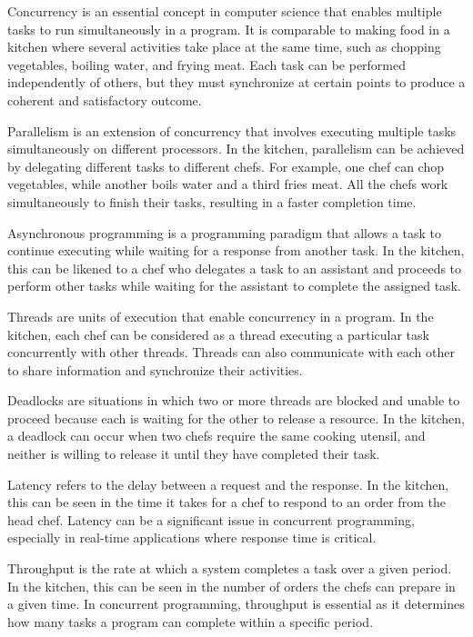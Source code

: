 Concurrency is an essential concept in computer science that enables multiple tasks to run simultaneously in a program.
It is comparable to making food in a kitchen where several activities take place at the same time, such as chopping vegetables, boiling water, and frying meat.
Each task can be performed independently of others, but they must synchronize at certain points to produce a coherent and satisfactory outcome.

Parallelism is an extension of concurrency that involves executing multiple tasks simultaneously on different processors.
In the kitchen, parallelism can be achieved by delegating different tasks to different chefs.
For example, one chef can chop vegetables, while another boils water and a third fries meat.
All the chefs work simultaneously to finish their tasks, resulting in a faster completion time.

Asynchronous programming is a programming paradigm that allows a task to continue executing while waiting for a response from another task.
In the kitchen, this can be likened to a chef who delegates a task to an assistant and proceeds to perform other tasks while waiting for the assistant to complete the assigned task.

Threads are units of execution that enable concurrency in a program.
In the kitchen, each chef can be considered as a thread executing a particular task concurrently with other threads.
Threads can also communicate with each other to share information and synchronize their activities.

Deadlocks are situations in which two or more threads are blocked and unable to proceed because each is waiting for the other to release a resource.
In the kitchen, a deadlock can occur when two chefs require the same cooking utensil, and neither is willing to release it until they have completed their task.

Latency refers to the delay between a request and the response.
In the kitchen, this can be seen in the time it takes for a chef to respond to an order from the head chef.
Latency can be a significant issue in concurrent programming, especially in real-time applications where response time is critical.

Throughput is the rate at which a system completes a task over a given period.
In the kitchen, this can be seen in the number of orders the chefs can prepare in a given time.
In concurrent programming, throughput is essential as it determines how many tasks a program can complete within a specific period.

